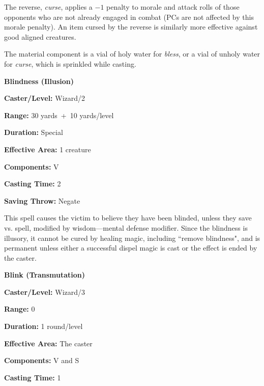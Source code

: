 \begin{multicols}{2}
The reverse, \textit{curse}, applies a $-1$ penalty to morale and attack rolls of those opponents who are not already engaged in combat (PCs are not affected by this morale penalty).  An item cursed by the reverse is similarly more effective against good aligned creatures.

The material component is a vial of holy water for \textit{bless}, or a vial of unholy water for \textit{curse}, which is sprinkled while casting.

\vspace{1em}

\noindent
\begin{minipage}{\columnwidth}

\noindent \textbf{Blindness (Illusion)}

\noindent \textbf{Caster/Level:} Wizard/2

\noindent \textbf{Range:} 30 yards~+~10 yards/level

\noindent \textbf{Duration:} Special

\noindent \textbf{Effective Area:} 1 creature

\noindent \textbf{Components:} V

\noindent \textbf{Casting Time:} 2

\noindent \textbf{Saving Throw:} Negate

\end{minipage}

This spell causes the victim to believe they have been blinded, unless they save vs. spell, modified by wisdom---mental defense modifier.  Since the blindness is illusory, it cannot be cured by healing magic, including ``remove blindness", and is permanent unless either a successful dispel magic is cast or the effect is ended by the caster.

\vspace{1em}
 
\noindent
\begin{minipage}{\columnwidth}

\noindent \textbf{Blink (Transmutation)}

\noindent \textbf{Caster/Level:} Wizard/3

\noindent \textbf{Range:} 0

\noindent \textbf{Duration:} 1 round/level

\noindent \textbf{Effective Area:} The caster

\noindent \textbf{Components:} V and S

\noindent \textbf{Casting Time:} 1


\end{minipage}
\end{multicols}
